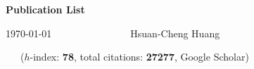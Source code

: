 \documentclass[10pt,a4paper]{article}
\begin{document}
\centerline{\Large\bf Publication List}
\bigskip
\centerline{\large\today~~~~~~~~~~~~~~~~Hsuan-Cheng Huang}

%
%


\vspace{16pt}
\hspace{-0.2in}{\bf Journal Papers:}~~~($h$-index: {\bf 78}, total citations: {\bf 27277}, Google Scholar) %
\end{document}
